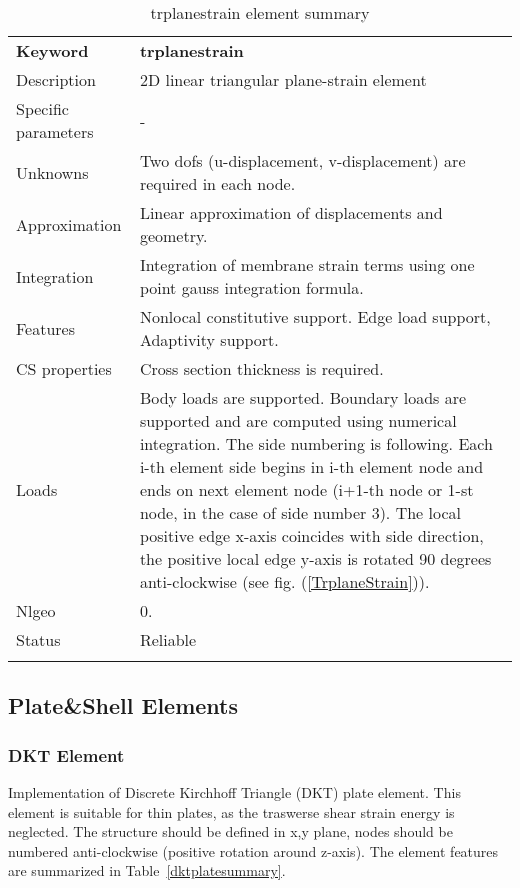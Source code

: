 \documentclass[a4paper]{article}
\newcommand{\param}[1]{\texttt{#1}} %
\newcommand{\templabel}{}%
\newcommand{\tempcaption}{}%
\newcounter{nelpar}
\newenvironment{elementsummary}[5]{%
  \gdef\tempcaption{#4}%
  \gdef\templabel{#5}%
  \setcounter{nelpar}{0}%
  \begin{center} %
    \begin{table}[!htb] %
      \begin{tabular}{|l|p{9cm}|}\hline %
        {\bf Keyword} & \bf{#1}\\ %
        {Description} & {#2}\\ %
        {Specific parameters} & {#3}\\ \hline %
}{
  \\ \hline %
      \end{tabular}%
      \caption{\tempcaption}%
      \label{\templabel}%
    \end{table}%
  \end{center}%
}
\newcommand{\elementParam}[1]{%
  \ifthenelse{\value{nelpar}>0} %
             {&{#1}}%
             {\setcounter{nelpar}{1}Parameters&{#1}}%
             \\%
}
\newcommand{\elementDescription}[2]{{#1} & {#2}\\ }
\begin{document}
\begin{elementsummary}{trplanestrain}{2D linear triangular plane-strain element}{-}{trplanestrain element summary}{trplanestrainsummary}
\elementDescription{Unknowns}{Two dofs (u-displacement, v-displacement) are required in each node.}
\elementDescription{Approximation}{Linear approximation of displacements and geometry.}
\elementDescription{Integration}{Integration of membrane strain terms using one point gauss integration formula.}
\elementDescription{Features}{Nonlocal constitutive support. Edge load support, Adaptivity support.}
\elementDescription{CS properties}{Cross section thickness is required.}
\elementDescription{Loads}{Body loads are supported. Boundary loads are supported and are computed  using numerical integration. The side numbering is following. Each i-th element side begins in i-th element node and ends on next element node (i+1-th node or 1-st node, in the case of side number 3). The local positive edge x-axis coincides with side direction, the positive local edge y-axis is rotated 90 degrees anti-clockwise (see fig. (\ref{TrplaneStrain})).}
\elementDescription{Nlgeo}{0.}
\elementDescription{Status}{Reliable}
\end{elementsummary}




\clearpage
\subsection{Plate\&Shell Elements}


\subsubsection {DKT Element}
\label{dkt}
Implementation of Discrete Kirchhoff Triangle (DKT) plate element.
This element is suitable for thin plates, as the traswerse shear strain energy is neglected.
The structure should be defined in x,y plane, nodes should be numbered anti-clockwise (positive rotation around
z-axis). The element features are summarized in Table~\ref{dktplatesummary}.
\end{document}
